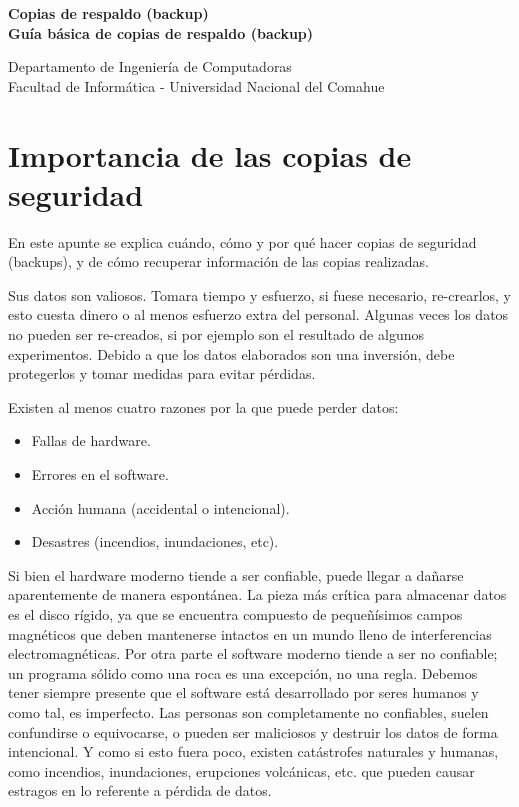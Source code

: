 ﻿\documentclass[12pt]{article}
\def\maketitle{

 \makeatletter
 {\color{bl} \centering \huge \sc \textbf{
 Copias de respaldo (backup)\\ 
\large \vspace*{-8pt} \color{black} Guía básica de copias de respaldo (backup)
 \vspace*{8pt} }\par}
 \makeatother


 \makeatletter
 {\centering \small 
 	Departamento de Ingeniería de Computadoras \\
 	Facultad de Informática - Universidad Nacional del Comahue \\
 	\vspace{20pt} }
 \makeatother

}
\begin{document}
\thispagestyle{empty}
\maketitle
\setlength{\parindent}{0pt}


\section{Importancia de las copias de seguridad}
 En este apunte se explica cuándo, cómo y  por qué hacer copias de 
seguridad (backups), y de cómo recuperar información de las 
copias realizadas.

Sus datos son valiosos. Tomara tiempo y esfuerzo, si fuese necesario,
re-crearlos, y esto cuesta dinero o al menos esfuerzo extra del personal.
Algunas veces los datos no pueden ser re-creados, si por ejemplo son el 
resultado de algunos experimentos. Debido a que los datos elaborados son una 
inversión, debe protegerlos y tomar medidas para evitar pérdidas.

Existen al menos cuatro razones por la que puede perder datos: 
\begin{itemize}
\item Fallas de hardware.
\item Errores en el software. 
\item Acción humana (accidental o intencional). 
\item Desastres (incendios, inundaciones, etc). 
\end{itemize}

 Si bien el hardware moderno tiende a ser confiable, puede llegar a dañarse
aparentemente de manera espontánea. La pieza más crítica para 
almacenar datos es el disco rígido, ya que se encuentra compuesto de 
pequeñísimos campos magnéticos que deben mantenerse intactos en un mundo 
lleno de interferencias electromagnéticas.  
Por otra parte el software moderno tiende a ser no confiable; un programa 
sólido como una roca es una excepción, no una regla. Debemos tener siempre
presente que el software está desarrollado por seres humanos y como tal, es
imperfecto. Las personas son completamente no confiables, suelen confundirse
o equivocarse, o pueden ser maliciosos y destruir los datos de forma 
intencional. Y como si esto fuera poco, existen catástrofes naturales y
humanas, como incendios, inundaciones, erupciones volcánicas, etc. 
que pueden causar estragos en lo referente a pérdida de datos.  

\end{document}
